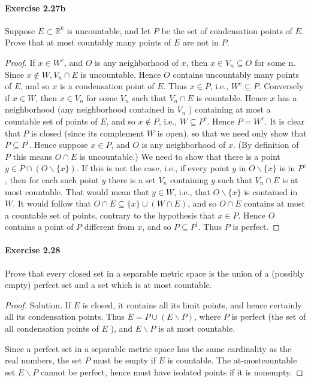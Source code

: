 \documentclass{article}
\theoremstyle{definition}
\begin{document}
\paragraph{Exercise 2.27b} Suppose $E\subset\mathbb{R}^k$ is uncountable, and let $P$ be the set of condensation points of $E$. Prove that at most countably many points of $E$ are not in $P$.
\begin{proof}
    If $x \in W^c$, and $O$ is any neighborhood of $x$, then $x \in V_n \subseteq O$ for some n. Since $x \notin W, V_n \cap E$ is uncountable. Hence $O$ contains uncountably many points of $E$, and so $x$ is a condensation point of $E$. Thus $x \in P$, i.e., $W^c \subseteq P$.
Conversely if $x \in W$, then $x \in V_n$ for some $V_n$ such that $V_n \cap E$ is countable. Hence $x$ has a neighborhood (any neighborhood contained in $V_n$ ) containing at most a countable set of points of $E$, and so $x \notin P$, i.e., $W \subseteq P^c$. Hence $P=W^c$.
It is clear that $P$ is closed (since its complement $W$ is open), so that we need only show that $P \subseteq P^{\prime}$. Hence suppose $x \in P$, and $O$ is any neighborhood of $x$. (By definition of $P$ this means $O \cap E$ is uncountable.) We need to show that there is a point $y \in P \cap(O \backslash\{x\})$. If this is not the case, i.e., if every point $y$ in $O \backslash\{x\}$ is in $P^c$, then for each such point $y$ there is a set $V_n$ containing $y$ such that $V_n \cap E$ is at most countable. That would mean that $y \in W$, i.e., that $O \backslash\{x\}$ is contained in $W$. It would follow that $O \cap E \subseteq\{x\} \cup(W \cap E)$, and so $O \cap E$ contains at most a countable set of points, contrary to the hypothesis that $x \in P$. Hence $O$ contains a point of $P$ different from $x$, and so $P \subseteq P^{\prime}$. Thus $P$ is perfect.
\end{proof}


\paragraph{Exercise 2.28} Prove that every closed set in a separable metric space is the union of a (possibly empty) perfect set and a set which is at most countable.
\begin{proof}
    Solution. If $E$ is closed, it contains all its limit points, and hence certainly all its condensation points. Thus $E=P \cup(E \backslash P)$, where $P$ is perfect (the set of all condensation points of $E$ ), and $E \backslash P$ is at most countable.

Since a perfect set in a separable metric space has the same cardinality as the real numbers, the set $P$ must be empty if $E$ is countable. The at-mostcountable set $E \backslash P$ cannot be perfect, hence must have isolated points if it is nonempty.
\end{proof}
\end{document}
